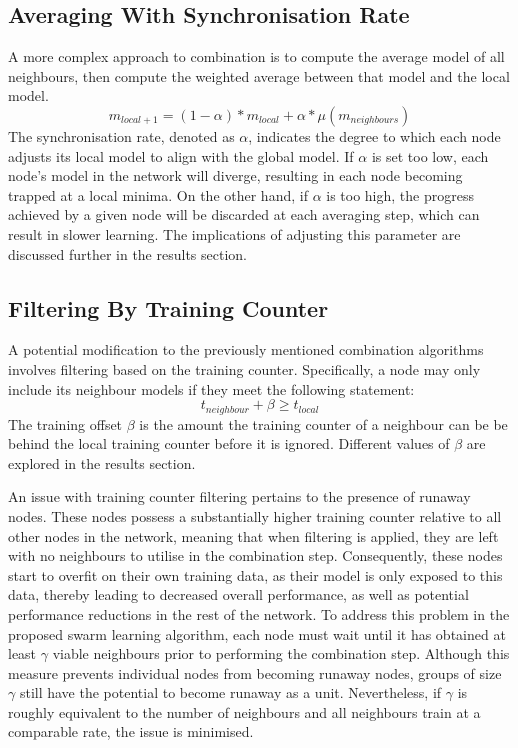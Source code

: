 \subsection{Averaging With Synchronisation Rate}
A more complex approach to combination is to compute the average model of all neighbours, then compute the weighted average between that model and the local model.
\[ m_{local+1} = (1 - \alpha) * m_{local} + \alpha * \mu ( m_{neighbours} )\]
The synchronisation rate, denoted as $\alpha$, indicates the degree to which each node adjusts its local model to align with the global model. If $\alpha$ is set too low, each node's model in the network will diverge, resulting in each node becoming trapped at a local minima. On the other hand, if $\alpha$ is too high, the progress achieved by a given node will be discarded at each averaging step, which can result in slower learning. The implications of adjusting this parameter are discussed further in the results section.

\subsection{Filtering By Training Counter}
A potential modification to the previously mentioned combination algorithms involves filtering based on the training counter. Specifically, a node may only include its neighbour models if they meet the following statement:
\[t_{neighbour} + \beta \ge t_{local} \]
The training offset $\beta$ is the amount the training counter of a neighbour can be be behind the local training counter before it is ignored. Different values of $\beta$ are explored in the results section.

An issue with training counter filtering pertains to the presence of runaway nodes. These nodes possess a substantially higher training counter relative to all other nodes in the network, meaning that when filtering is applied, they are left with no neighbours to utilise in the combination step. Consequently, these nodes start to overfit on their own training data, as their model is only exposed to this data, thereby leading to decreased overall performance, as well as potential performance reductions in the rest of the network. To address this problem in the proposed swarm learning algorithm, each node must wait until it has obtained at least $\gamma$ viable neighbours prior to performing the combination step. Although this measure prevents individual nodes from becoming runaway nodes, groups of size $\gamma$ still have the potential to become runaway as a unit. Nevertheless, if $\gamma$ is roughly equivalent to the number of neighbours and all neighbours train at a comparable rate, the issue is minimised.

